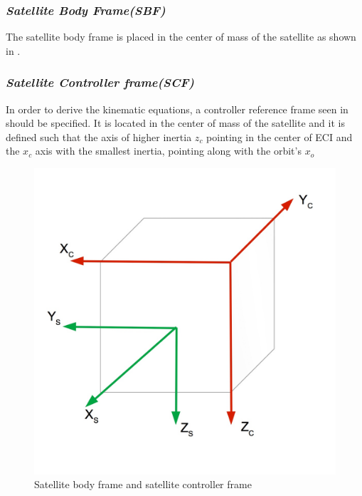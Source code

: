 \subsubsection{\textit{Satellite Body Frame(SBF)}}
The satellite body frame is placed in the center of mass of the satellite as shown in  . 
\subsubsection{\textit{Satellite Controller frame(SCF)}}
In order to derive the kinematic equations, a controller reference frame seen in  should be specified. It is located in the center of mass of the satellite and it is defined such that the axis of higher inertia $z_{c}$ pointing in the center of ECI and the $x_{c}$ axis with the smallest inertia, pointing along with  the orbit's $x_{o}$ 
\begin{figure}[H]
	\centering
	\includegraphics[width=0.4\linewidth]{figures/frames}
	\caption{Satellite body frame and satellite controller frame}
	\label{fig:frames}
\end{figure}

